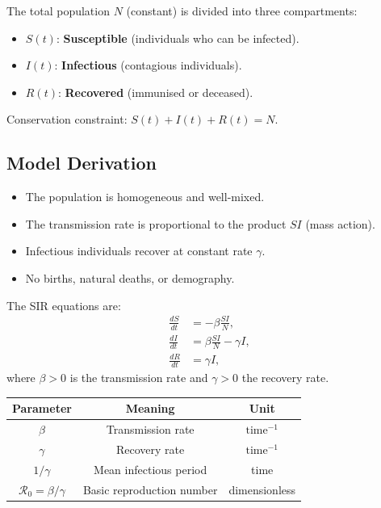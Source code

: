 \begin{definition}
The total population $N$ (constant) is divided into three compartments:
\begin{itemize}
  \item $S(t)$: \textbf{Susceptible} (individuals who can be infected).
  \item $I(t)$: \textbf{Infectious} (contagious individuals).
  \item $R(t)$: \textbf{Recovered} (immunised or deceased).
\end{itemize}
Conservation constraint: $S(t)+I(t)+R(t)=N$.
\end{definition}

\subsection{Model Derivation}

\begin{intuition}[title=\textbf{SIR assumptions}]
\begin{itemize}
  \item The population is homogeneous and well-mixed.
  \item The transmission rate is proportional to the product $SI$
    (mass action).
  \item Infectious individuals recover at constant rate $\gamma$.
  \item No births, natural deaths, or demography.
\end{itemize}
\end{intuition}

The SIR equations are:
\begin{align}
  \frac{dS}{dt} &= -\beta\frac{SI}{N}, \label{eq:sir_s}\\
  \frac{dI}{dt} &= \beta\frac{SI}{N} - \gamma I, \label{eq:sir_i}\\
  \frac{dR}{dt} &= \gamma I, \label{eq:sir_r}
\end{align}
where $\beta>0$ is the transmission rate and $\gamma>0$ the recovery
rate.

\begin{keyformulas}[title=\textbf{SIR model parameters}]
\begin{center}
\begin{tabular}{ccc}
\toprule
Parameter & Meaning & Unit \\
\midrule
$\beta$ & Transmission rate & $\text{time}^{-1}$ \\
$\gamma$ & Recovery rate & $\text{time}^{-1}$ \\
$1/\gamma$ & Mean infectious period & time \\
$\mathcal{R}_0 = \beta/\gamma$ & Basic reproduction number & dimensionless \\
\bottomrule
\end{tabular}
\end{center}
\end{keyformulas}

